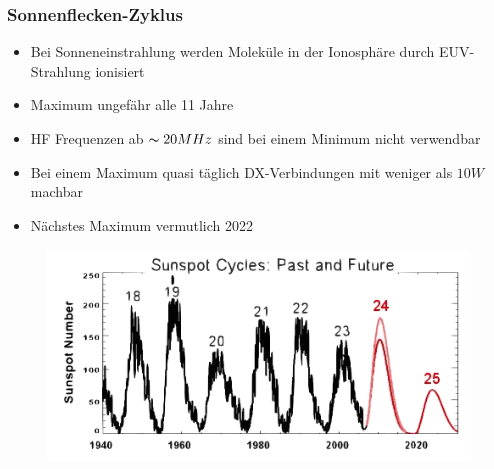 \begin{frame}
    \frametitle{Sonnenflecken-Zyklus}
    \begin{itemize}
    			\item Bei Sonneneinstrahlung werden Moleküle in der Ionosphäre durch EUV-Strahlung ionisiert
			\item Maximum ungefähr alle 11 Jahre
                        \item HF Frequenzen ab $\thicksim20MHz$ sind bei einem Minimum nicht verwendbar
       		 	\item Bei einem Maximum quasi täglich DX-Verbindungen mit weniger als $10W$ machbar 
        		\item Nächstes Maximum vermutlich 2022
    \end{itemize}
	\begin{center}
         \begin{figure}
      \includegraphics[width=.8\textwidth,height=.3\textheight,keepaspectratio]{e09/Predictions_sunspot.png}
    \end{figure}
    \end{center}
\end{frame}


